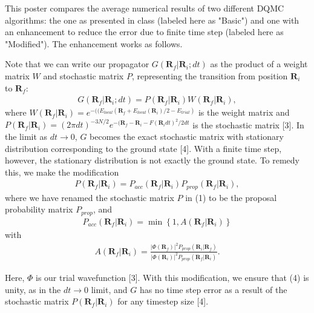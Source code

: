 \documentclass[final]{beamer}
\newlength{\onecolwid}
\begin{document}
\begin{frame}[t]
\begin{columns}[t]
\begin{column}{\onecolwid}
\begin{block}
{

This poster compares the average numerical results of two different DQMC algorithms: the one as presented in class (labeled here as "Basic") and one with an enhancement to reduce the error due to finite time step (labeled here as "Modified"). The enhancement works as follows.
}
\end{block}
\begin{block}

{
Note that we can write our propagator $G(\mathbf{R}_f|\mathbf{R}_i; dt)$ as the product of a weight matrix $W$ and stochastic matrix $P$, representing the transition from position $\mathbf{R}_i$ to $\mathbf{R}_f$:
\begin{align}
    G(\mathbf{R}_f|\mathbf{R}_i; dt) = P(\mathbf{R}_f|\mathbf{R}_i)W(\mathbf{R}_f|\mathbf{R}_i),
\end{align}
where $W(\mathbf{R}_f|\mathbf{R}_i) = e^{-((E_{local}(\mathbf{R}_f + E_{local}(\mathbf{R}_i)/2 -E_{trial})}$ is the weight matrix and $P(\mathbf{R}_f|\mathbf{R}_i) = (2\pi dt)^{-3N/2}e^{-(\mathbf{R}_f - \mathbf{R}_i - F(\mathbf{R}_i dt)^2 /2dt}$ is the stochastic matrix [3]. In the limit as $dt \to 0$, $G$ becomes the exact stochastic matrix with stationary distribution corresponding to the ground state [4]. With a finite time step, however, the stationary distribution is not exactly the ground state. To remedy this, we make the modification
\begin{align}
    P(\mathbf{R}_f|\mathbf{R}_i) = P_{acc}(\mathbf{R}_f|\mathbf{R}_i)P_{prop}(\mathbf{R}_f|\mathbf{R}_i),
\end{align}
where we have renamed the stochastic matrix $P$ in (1) to be the proposal probability matrix $P_{prop}$, and
\begin{align}
    P_{acc}(\mathbf{R}_f|\mathbf{R}_i) = \min \left\{ 1, A(\mathbf{R}_f|\mathbf{R}_i) \right\}
\end{align}
with
\begin{align}
    A(\mathbf{R}_f|\mathbf{R}_i) = \frac{|\Phi(\mathbf{R}_f)|^2 P_{prop}(\mathbf{R}_i|\mathbf{R}_f)}{|\Phi(\mathbf{R}_i)|^2 P_{prop}(\mathbf{R}_f|\mathbf{R}_i)}.
\end{align}

Here, $\Phi$ is our trial wavefunction [3]. With this modification, we ensure that (4) is unity, as in the $dt \to 0$ limit, and $G$ has no time step error as a result of the stochastic matrix $P(\mathbf{R}_f|\mathbf{R}_i)$ for any timestep size [4].
}
\end{block}
\begin{block}


\end{block}
\end{column}
\end{columns}
\end{frame}
\end{document}
